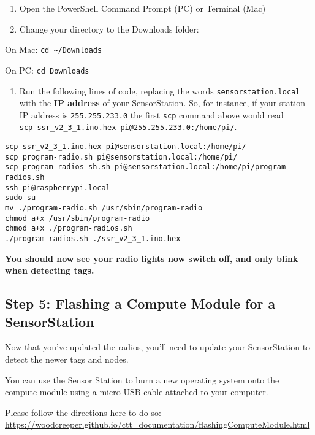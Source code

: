 \documentclass[
]{article}
\providecommand{\tightlist}{%
  \setlength{\itemsep}{0pt}\setlength{\parskip}{0pt}}
\begin{document}
\begin{enumerate}
\def\labelenumi{\arabic{enumi}.}
\setcounter{enumi}{2}
\item
  Open the PowerShell Command Prompt (PC) or Terminal (Mac)
\item
  Change your directory to the Downloads folder:
\end{enumerate}

On Mac: \texttt{cd\ \textasciitilde{}/Downloads}

On PC: \texttt{cd\ Downloads}

\begin{enumerate}
\def\labelenumi{\arabic{enumi}.}
\setcounter{enumi}{4}
\tightlist
\item
  Run the following lines of code, replacing the words
  \texttt{sensorstation.local} with the \textbf{IP address} of your
  SensorStation. So, for instance, if your station IP address is
  \texttt{255.255.233.0} the first \texttt{scp} command above would read
  \texttt{scp\ ssr\_v2\_3\_1.ino.hex\ pi@255.255.233.0:/home/pi/}.
\end{enumerate}

\begin{verbatim}
scp ssr_v2_3_1.ino.hex pi@sensorstation.local:/home/pi/
scp program-radio.sh pi@sensorstation.local:/home/pi/
scp program-radios_sh.sh pi@sensorstation.local:/home/pi/program-radios.sh
ssh pi@raspberrypi.local 
sudo su
mv ./program-radio.sh /usr/sbin/program-radio
chmod a+x /usr/sbin/program-radio
chmod a+x ./program-radios.sh
./program-radios.sh ./ssr_v2_3_1.ino.hex
\end{verbatim}

\textbf{You should now see your radio lights now switch off, and only
blink when detecting tags.}

\hypertarget{step-5-flashing-a-compute-module-for-a-sensorstation}{%
\subsection{Step 5: Flashing a Compute Module for a
SensorStation}\label{step-5-flashing-a-compute-module-for-a-sensorstation}}

Now that you've updated the radios, you'll need to update your
SensorStation to detect the newer tags and nodes.

You can use the Sensor Station to burn a new operating system onto the
compute module using a micro USB cable attached to your computer.

Please follow the directions here to do so:
\url{https://woodcreeper.github.io/ctt_documentation/flashingComputeModule.html}
\end{document}
